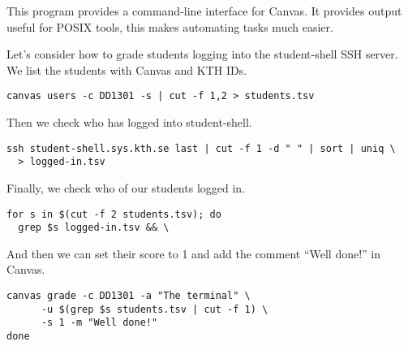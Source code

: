 
This program provides a command-line interface for Canvas.
It provides output useful for POSIX tools, this makes automating tasks much 
easier.

Let's consider how to grade students logging into the student-shell SSH server.
We list the students with Canvas and KTH IDs.
\begin{lstlisting}
canvas users -c DD1301 -s | cut -f 1,2 > students.tsv
\end{lstlisting}
Then we check who has logged into student-shell.
\begin{lstlisting}[firstnumber=2]
ssh student-shell.sys.kth.se last | cut -f 1 -d " " | sort | uniq \
  > logged-in.tsv
\end{lstlisting}
Finally, we check who of our students logged in.
\begin{lstlisting}[firstnumber=4]
for s in $(cut -f 2 students.tsv); do
  grep $s logged-in.tsv && \
\end{lstlisting}
And then we can set their score to 1 and add the comment \enquote{Well done!} 
in Canvas.
\begin{lstlisting}[firstnumber=6]
    canvas grade -c DD1301 -a "The terminal" \
      -u $(grep $s students.tsv | cut -f 1) \
      -s 1 -m "Well done!"
done
\end{lstlisting}

